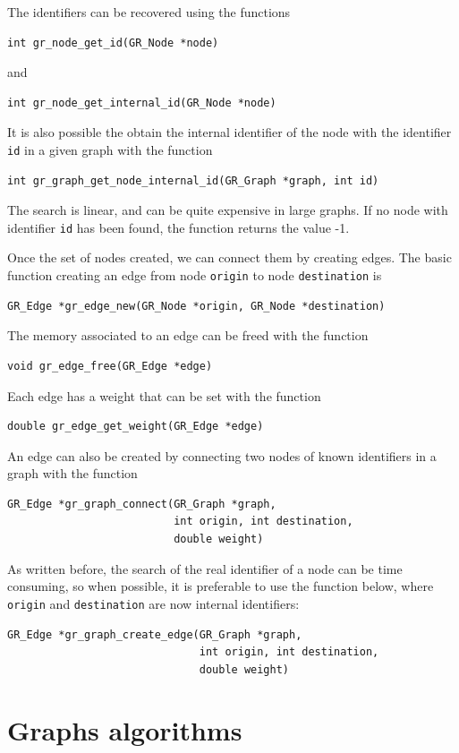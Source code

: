 The identifiers can be recovered using the functions
\begin{verbatim}
int gr_node_get_id(GR_Node *node)
\end{verbatim}
and
\begin{verbatim}
int gr_node_get_internal_id(GR_Node *node)
\end{verbatim}
It is also possible the obtain the internal identifier of the node with the identifier \verb|id| in a given graph with the function
\begin{verbatim}
int gr_graph_get_node_internal_id(GR_Graph *graph, int id)
\end{verbatim}
The search is linear, and can be quite expensive in large graphs.
If no node with identifier \verb|id| has been found, the function returns the value -1.

Once the set of nodes created, we can connect them by creating edges.
The basic function creating an edge from node \verb|origin| to node \verb|destination| is
\begin{verbatim}
GR_Edge *gr_edge_new(GR_Node *origin, GR_Node *destination)
\end{verbatim}
The memory associated to an edge can be freed with the function
\begin{verbatim}
void gr_edge_free(GR_Edge *edge)
\end{verbatim}
Each edge has a weight that can be set with the function
\begin{verbatim}
double gr_edge_get_weight(GR_Edge *edge)
\end{verbatim}

An edge can also be created by connecting two nodes of known identifiers in a graph with the function
\begin{verbatim}
GR_Edge *gr_graph_connect(GR_Graph *graph,
                          int origin, int destination,
                          double weight)
\end{verbatim}
As written before, the search of the real identifier of a node can be time consuming, so when possible, it is preferable to use the function below, where \verb|origin| and \verb|destination| are now internal identifiers:
\begin{verbatim}
GR_Edge *gr_graph_create_edge(GR_Graph *graph,
                              int origin, int destination,
                              double weight)
\end{verbatim}
			  
\section{Graphs algorithms}

